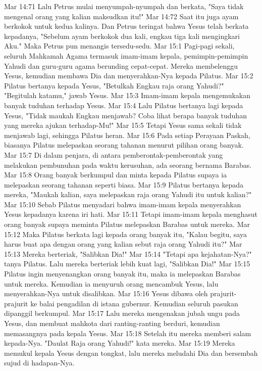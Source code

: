 Mar 14:71  Lalu Petrus mulai menyumpah-nyumpah dan berkata, "Saya tidak mengenal orang yang kalian maksudkan itu!"
Mar 14:72  Saat itu juga ayam berkokok untuk kedua kalinya. Dan Petrus teringat bahwa Yesus telah berkata kepadanya, "Sebelum ayam berkokok dua kali, engkau tiga kali mengingkari Aku." Maka Petrus pun menangis tersedu-sedu.
Mar 15:1  Pagi-pagi sekali, seluruh Mahkamah Agama termasuk imam-imam kepala, pemimpin-pemimpin Yahudi dan guru-guru agama berunding cepat-cepat. Mereka membelenggu Yesus, kemudian membawa Dia dan menyerahkan-Nya kepada Pilatus.
Mar 15:2  Pilatus bertanya kepada Yesus, "Betulkah Engkau raja orang Yahudi?" "Begitulah katamu," jawab Yesus.
Mar 15:3  Imam-imam kepala mengemukakan banyak tuduhan terhadap Yesus.
Mar 15:4  Lalu Pilatus bertanya lagi kepada Yesus, "Tidak maukah Engkau menjawab? Coba lihat berapa banyak tuduhan yang mereka ajukan terhadap-Mu!"
Mar 15:5  Tetapi Yesus sama sekali tidak menjawab lagi, sehingga Pilatus heran.
Mar 15:6  Pada setiap Perayaan Paskah, biasanya Pilatus melepaskan seorang tahanan menurut pilihan orang banyak.
Mar 15:7  Di dalam penjara, di antara pemberontak-pemberontak yang melakukan pembunuhan pada waktu kerusuhan, ada seorang bernama Barabas.
Mar 15:8  Orang banyak berkumpul dan minta kepada Pilatus supaya ia melepaskan seorang tahanan seperti biasa.
Mar 15:9  Pilatus bertanya kepada mereka, "Maukah kalian, saya melepaskan raja orang Yahudi itu untuk kalian?"
Mar 15:10  Sebab Pilatus menyadari bahwa imam-imam kepala menyerahkan Yesus kepadanya karena iri hati.
Mar 15:11  Tetapi imam-imam kepala menghasut orang banyak supaya meminta Pilatus melepaskan Barabas untuk mereka.
Mar 15:12  Maka Pilatus berkata lagi kepada orang banyak itu, "Kalau begitu, saya harus buat apa dengan orang yang kalian sebut raja orang Yahudi itu?"
Mar 15:13  Mereka berteriak, "Salibkan Dia!"
Mar 15:14  "Tetapi apa kejahatan-Nya?" tanya Pilatus. Lalu mereka berteriak lebih kuat lagi, "Salibkan Dia!"
Mar 15:15  Pilatus ingin menyenangkan orang banyak itu, maka ia melepaskan Barabas untuk mereka. Kemudian ia menyuruh orang mencambuk Yesus, lalu menyerahkan-Nya untuk disalibkan.
Mar 15:16  Yesus dibawa oleh prajurit-prajurit ke balai pengadilan di istana gubernur. Kemudian seluruh pasukan dipanggil berkumpul.
Mar 15:17  Lalu mereka mengenakan jubah ungu pada Yesus, dan membuat mahkota dari ranting-ranting berduri, kemudian memasangnya pada kepala Yesus.
Mar 15:18  Setelah itu mereka memberi salam kepada-Nya. "Daulat Raja orang Yahudi!" kata mereka.
Mar 15:19  Mereka memukul kepala Yesus dengan tongkat, lalu mereka meludahi Dia dan bersembah sujud di hadapan-Nya.
